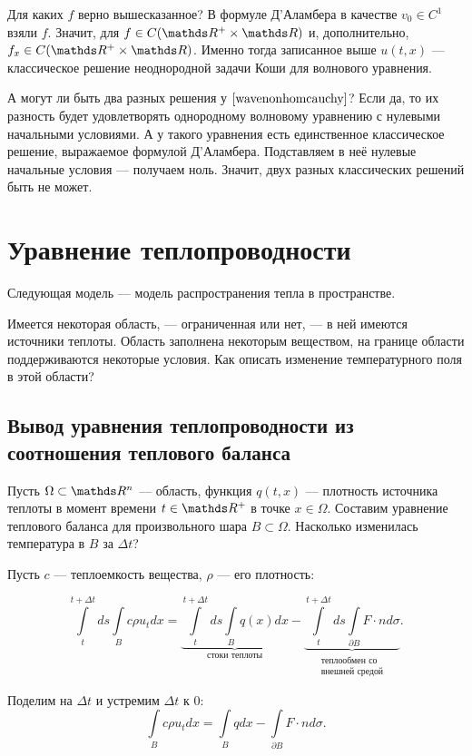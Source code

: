 Для каких $f$ верно вышесказанное? В формуле Д'Аламбера в качестве $v_0 \in C^1$ взяли $f$. Значит, для $f \in C(\real^+ \times \real)$ и, дополнительно, $f_x \in C(\real^+ \times \real)$. Именно тогда записанное выше $u(t,x)$ --- классическое решение неоднородной задачи Коши для волнового уравнения.

А могут ли быть два разных решения у $\eqref{wavenonhomcauchy}$? Если да, то их разность будет удовлетворять однородному волновому уравнению с нулевыми начальными условиями. А у такого уравнения есть единственное классическое решение, выражаемое формулой Д'Аламбера. Подставляем в неё нулевые начальные условия --- получаем ноль. Значит, двух разных классических решений быть не может.

\section{Уравнение теплопроводности}
Следующая модель --- модель распространения тепла в пространстве.

Имеется некоторая область, --- ограниченная или нет, --- в ней имеются источники теплоты. Область заполнена некоторым веществом, на границе области поддерживаются некоторые условия. Как описать изменение температурного поля в этой области?

\subsection{Вывод уравнения теплопроводности из соотношения теплового баланса}

Пусть $\Omega \subset \real^n$ --- область, функция $q(t,x)$ --- плотность источника теплоты в момент времени $t \in \real^+$ в точке $x \in \Omega$. Составим уравнение теплового баланса для произвольного шара $B \subset \Omega$. Насколько изменилась температура в $B$ за $\Delta t$?

Пусть $c$ --- теплоемкость вещества, $\rho$ --- его плотность:

$$ \int \limits_t^{t +\Delta t} ds \int \limits_B  c \rho u_t dx = \underbrace {\int \limits_t^{t + \Delta t} ds \int \limits_B q(x) dx}_{\text{стоки теплоты}} - \underbrace {\int \limits_t^{t + \Delta t} ds \int \limits_{\partial B} F \cdot n d \sigma}_{\substack{\text{теплообмен со} \\ \text{внешней средой}}}.$$

Поделим на $\Delta t$ и устремим $\Delta t$ к $0$:
$$ \int \limits_B c \rho u_t dx = \int \limits_B q dx - \int \limits_{\partial B} F \cdot n d \sigma. $$


